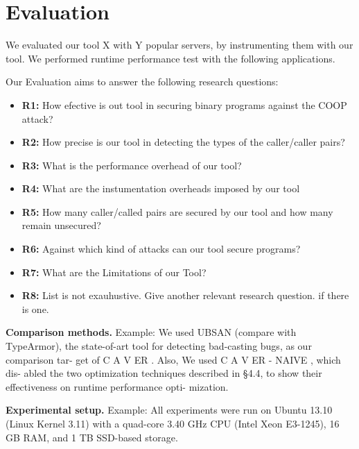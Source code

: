\chapter{Evaluation}
\label{chapter:Evaluation}
We evaluated our tool X with Y popular servers, by instrumenting them with our tool.
We performed runtime performance test with the following applications.

Our Evaluation aims to answer the following research questions:
\begin{itemize}
 \item \textbf{R1:} How efective is out tool in securing binary programs against the COOP attack?
 
 \item \textbf{R2:} How precise is our tool in detecting the types of the caller/caller pairs?
 
 \item \textbf{R3:} What is the performance overhead of our tool?
 
 \item \textbf{R4:} What are the instumentation overheads imposed by our tool 
 
 \item \textbf{R5:} How many caller/called pairs are secured by our tool and how many remain unsecured?
 
 \item \textbf{R6:} Against which kind of attacks can our tool secure programs?
 
 \item \textbf{R7:} What are the Limitations of our Tool?
 
 \item \textbf{R8:} List is not exauhustive. Give another relevant research question. if there is one.
 
\end{itemize}

\textbf{Comparison methods.} Example: We used UBSAN (compare with TypeArmor), the state-of-art
tool for detecting bad-casting bugs, as our comparison tar-
get of C A V ER . Also, We used C A V ER - NAIVE , which dis-
abled the two optimization techniques described in §4.4,
to show their effectiveness on runtime performance opti-
mization.

\textbf{Experimental setup.} Example: All experiments were run on
Ubuntu 13.10 (Linux Kernel 3.11) with a quad-core 3.40
GHz CPU (Intel Xeon E3-1245), 16 GB RAM, and 1 TB
SSD-based storage.


